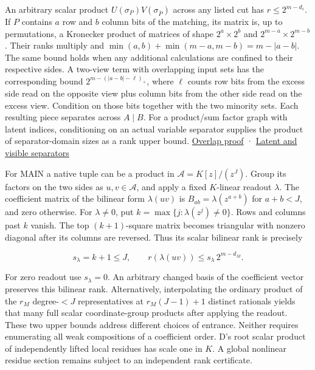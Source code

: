 \documentclass[
  11pt,
]{article}
\begin{document}
An arbitrary scalar product \(U(\sigma_P)V(\sigma_{\bar P})\) across any
listed cut has \(r\le2^{m-d_s}\). If \(P\) contains \(a\) row and \(b\)
column bits of the matching, its matrix is, up to permutations, a
Kronecker product of matrices of shape \(2^a\times2^b\) and
\(2^{m-a}\times2^{m-b}\). Their ranks multiply and
\(\min(a,b)+\min(m-a,m-b)=m-|a-b|\). The same bound holds when any
additional calculations are confined to their respective sides. A
two-view term with overlapping input sets has the corresponding bound
\(2^{m-(|a-b|-\ell)_+}\), where \(\ell\) counts row bits from the excess
side read on the opposite view plus column bits from the other side read
on the excess view. Condition on those bits together with the two
minority sets. Each resulting piece separates across \(A\mid B\). For a
product/sum factor graph with latent indices, conditioning on an actual
variable separator supplies the product of separator-domain sizes as a
rank upper bound.
\href{https://github.com/dch-and-Elara/some-research-inspired-by-openais-eth-preprint/tree/main/root-separation}{Overlap proof} ·
\href{https://github.com/dch-and-Elara/some-research-inspired-by-openais-eth-preprint/tree/main/root-separation}{Latent and visible
separators}

For MAIN a native tuple can be a product in \(\mathcal A=K[z]/(z^J)\).
Group its factors on the two sides as \(u,v\in\mathcal A\), and apply a
fixed \(K\)-linear readout \(\lambda\). The coefficient matrix of the
bilinear form \(\lambda(uv)\) is \(B_{ab}=\lambda(z^{a+b})\) for
\(a+b<J\), and zero otherwise. For \(\lambda\ne0\), put
\(k=\max\{j:\lambda(z^j)\ne0\}\). Rows and columns past \(k\) vanish.
The top \((k+1)\)-square matrix becomes triangular with nonzero diagonal
after its columns are reversed. Thus its scalar bilinear rank is
precisely

\[
 s_\lambda=k+1\le J,\qquad r(\lambda(uv))\le s_\lambda\,2^{m-d_M}.
 \tag{X.6}
\]

For zero readout use \(s_\lambda=0\). An arbitrary changed basis of the
coefficient vector preserves this bilinear rank. Alternatively,
interpolating the ordinary product of the \(r_M\) degree-\(<J\)
representatives at \(r_M(J-1)+1\) distinct rationals yields that many
full scalar coordinate-group products after applying the readout. These
two upper bounds address different choices of entrance. Neither requires
enumerating all weak compositions of a coefficient order. D's root
scalar product of independently lifted local residues has scale one in
\(K\). A global nonlinear residue section remains subject to an
independent rank certificate.
\end{document}
